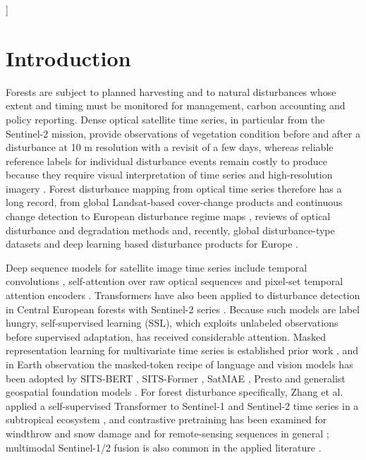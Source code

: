\documentclass[10pt,a4paper,twocolumn]{article}
\renewenvironment{abstract}{\small\begin{center}\begin{minipage}{0.86\textwidth}}{\end{minipage}\end{center}\vspace{6pt}}
\begin{document}
{\begin{@twocolumnfalse}
\begin{abstract}
\end{abstract}
\end{@twocolumnfalse}
}]

\section{Introduction}
Forests are subject to planned harvesting and to natural disturbances whose extent and timing must be monitored for management, carbon accounting and policy reporting. Dense optical satellite time series, in particular from the Sentinel-2 mission, provide observations of vegetation condition before and after a disturbance at 10 m resolution with a revisit of a few days, whereas reliable reference labels for individual disturbance events remain costly to produce because they require visual interpretation of time series and high-resolution imagery \cite{ref1,ref19}. Forest disturbance mapping from optical time series therefore has a long record, from global Landsat-based cover-change products \cite{ref17} and continuous change detection \cite{ref20} to European disturbance regime maps \cite{ref18}, reviews of optical disturbance and degradation methods \cite{ref19} and, recently, global disturbance-type datasets \cite{ref24} and deep learning based disturbance products for Europe \cite{ref28}.

Deep sequence models for satellite image time series include temporal convolutions \cite{ref11}, self-attention over raw optical sequences \cite{ref12} and pixel-set temporal attention encoders \cite{ref13}. Transformers have also been applied to disturbance detection in Central European forests with Sentinel-2 series \cite{ref27}. Because such models are label hungry, self-supervised learning (SSL), which exploits unlabeled observations before supervised adaptation, has received considerable attention. Masked representation learning for multivariate time series is established prior work \cite{ref3}, and in Earth observation the masked-token recipe of language and vision models \cite{ref14} has been adopted by SITS-BERT \cite{ref9}, SITS-Former \cite{ref10}, SatMAE \cite{ref15}, Presto \cite{ref7} and generalist geospatial foundation models \cite{ref16}. For forest disturbance specifically, Zhang et al. applied a self-supervised Transformer to Sentinel-1 and Sentinel-2 time series in a subtropical ecosystem \cite{ref2}, and contrastive pretraining has been examined for windthrow and snow damage \cite{ref29} and for remote-sensing sequences in general \cite{ref8}; multimodal Sentinel-1/2 fusion is also common in the applied literature \cite{ref25,ref26}.
\end{document}
